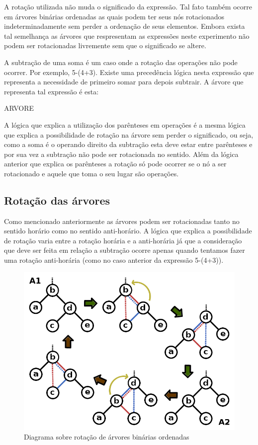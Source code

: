 	A rotação utilizada não muda o significado da expressão. Tal fato também ocorre em árvores binárias ordenadas as quais podem ter seus nós rotacionados indeterminadamente sem perder a ordenação de seus elementos. Embora exista tal semelhança as árvores que respresentam as expressões neste experimento não podem ser rotacionadas livremente sem que o significado se altere.
	
	A subtração de uma soma é um caso onde a rotação das operações não pode ocorrer. Por exemplo, 5-(4+3). Existe uma precedência lógica nesta expressão que representa a necessidade de primeiro somar para depois subtrair. A árvore que representa tal expressão é esta:
	
ARVORE
           
A lógica que explica a utilização dos parênteses em operações é a mesma lógica que explica  a possibilidade de rotação na árvore sem perder o significado, ou seja, como a soma é o operando direito da subtração esta deve estar entre parênteses e por sua vez a subtração não pode ser rotacionada no sentido. Além da lógica anterior que explica os parênteses a rotação só pode ocorrer se o nó a ser rotacionado e aquele que toma o seu lugar são operações.

\subsection{Rotação das árvores}
Como mencionado anteriormente as árvores podem ser rotacionadas tanto no sentido horário como no sentido anti-horário. A lógica que explica a possibilidade de rotação varia entre a rotação horária e a anti-horária já que a consideração que deve ser feita em relação a subtração ocorre apenas quando tentamos fazer uma rotação anti-horária (como no caso anterior da expressão 5-(4+3)).

\begin{figure}[H]
	\caption{\label{gram_cls}Diagrama sobre rotação de árvores binárias ordenadas}
	\begin{center}
	    \includegraphics[scale=0.25]{tree_rotations.png}
	\end{center}
\end{figure}

